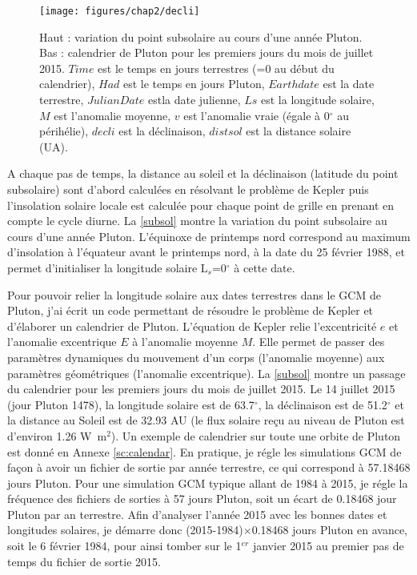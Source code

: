 \begin{figure}[!h]
\begin{center} 
	\texttt{[image: figures/chap2/decli]}
\end{center} 
\caption{Haut : variation du point subsolaire au cours d’une année Pluton. Bas : calendrier de Pluton pour les premiers jours du mois de juillet 2015. $Time$ est le temps en jours terrestres (=0 au début du calendrier), $Had$ est le temps en jours Pluton, $Earth date$ est la date terrestre, $JulianDate$ estla date julienne, $Ls$ est la longitude solaire, $M$ est l’anomalie moyenne, $v$ est l’anomalie vraie (égale à 0$^{\circ}$ au périhélie), $decli$ est la déclinaison, $dist sol$ est la distance solaire (UA).} 
\label{subsol}
\end{figure}

A chaque pas de temps, la distance au soleil et la déclinaison (latitude du point subsolaire) sont d’abord calculées en résolvant le problème de Kepler puis l’insolation solaire locale est calculée pour chaque point de grille en prenant en compte le cycle diurne.
La \autoref{subsol} montre la variation du point subsolaire au cours d’une année Pluton. L’équinoxe de printemps nord correspond au maximum d’insolation à l’équateur avant le printemps nord, à la date du 25 février 1988, et permet d’initialiser la longitude solaire L$_s$=0$^{\circ}$ à cette date. 

Pour pouvoir relier la longitude solaire aux dates terrestres dans le GCM de Pluton, j’ai écrit un code permettant de résoudre le problème de Kepler et d’élaborer un calendrier de Pluton. L'équation de Kepler relie l'excentricité $e$ et l'anomalie excentrique $E$ à l'anomalie moyenne $M$. Elle permet de passer des paramètres dynamiques du mouvement d'un corps (l'anomalie moyenne) aux paramètres géométriques (l'anomalie excentrique). La \autoref{subsol} montre un passage du calendrier pour les premiers jours du mois de juillet 2015. Le 14 juillet 2015 (jour Pluton 1478), la longitude solaire est de 63.7$^{\circ}$, la déclinaison est de 51.2$^{\circ}$ et la distance au Soleil est de 32.93 AU (le flux solaire reçu au niveau de Pluton est d’environ 1.26 W~m$^2$). Un exemple de calendrier sur toute une orbite de Pluton est donné en Annexe \ref{sc:calendar}. 
En pratique, je régle les simulations GCM de façon à avoir un fichier de sortie par année terrestre, ce qui correspond à 57.18468 jours Pluton. Pour une simulation GCM typique allant de 1984 à 2015, je régle la fréquence des fichiers de sorties à 57 jours Pluton, soit un écart de 0.18468 jour Pluton par an terrestre. Afin d’analyser l’année 2015 avec les bonnes dates et longitudes solaires, je démarre donc (2015-1984)$\times$0.18468 jours Pluton en avance, soit le 6 février 1984, pour ainsi tomber sur le 1$^{er}$ janvier 2015 au premier pas de temps du fichier de sortie 2015.  

